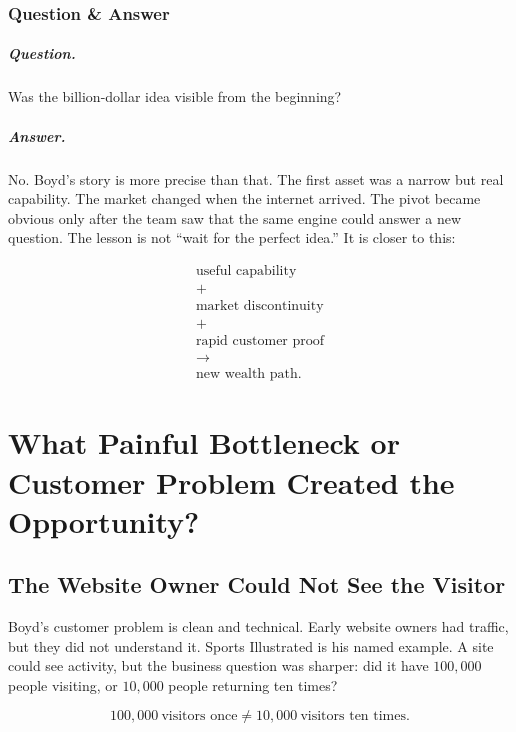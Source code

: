 \documentclass[11pt,oneside]{book}
\begin{document}
\subsection{Question \& Answer}

\paragraph{Question.}
Was the billion-dollar idea visible from the beginning?

\paragraph{Answer.}
No. Boyd's story is more precise than that. The first asset was a narrow but real capability. The market changed when the internet arrived. The pivot became obvious only after the team saw that the same engine could answer a new question. The lesson is not ``wait for the perfect idea.'' It is closer to this:

\begin{equation}
\begin{gathered}
\text{useful capability}\\
+\\
\text{market discontinuity}\\
+\\
\text{rapid customer proof}\\
\longrightarrow\\
\text{new wealth path}.
\end{gathered}
\end{equation}

\chapter{What Painful Bottleneck or Customer Problem Created the Opportunity?}

\section{The Website Owner Could Not See the Visitor}

Boyd's customer problem is clean and technical. Early website owners had traffic, but they did not understand it. Sports Illustrated is his named example. A site could see activity, but the business question was sharper: did it have \(100{,}000\) people visiting, or \(10{,}000\) people returning ten times?

\begin{equation}
100{,}000\ \text{visitors once}
\neq
10{,}000\ \text{visitors ten times}.
\end{equation}
\end{document}
